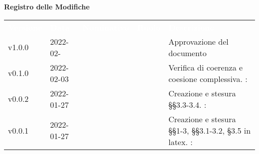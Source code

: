 

{\LARGE{\textbf{Registro delle Modifiche}}} \\
\begin{table}[!htbp]
\renewcommand{\arraystretch}{1.5}
\begin{tabular}{ m{}<{\centering}  m{}<{\centering}  m{}<{\centering}  m{}<{\centering}  m{}<{\centering} }
	\rowcolor{darkblue}
	\textcolor{white}{\textbf{Versione}} &\textcolor{white}{\textbf{Data}}& \textcolor{white}{\textbf{Nominativo}} & \textcolor{white}{\textbf{Ruolo}}&\textcolor{white}{\textbf{Descrizione}}\\ 

	v1.0.0 & 2022-02- & \ & \RE & Approvazione del documento \\

	v0.1.0& 2022-02-03 & \FP & \VE & Verifica di coerenza e coesione complessiva. \VE: \textit{\PV}\\

	v0.0.2& 2022-01-27& \FP &\AN & Creazione e stesura \S\S{}3.3-3.4. \VE: \textit{\PV}\\

	v0.0.1& 2022-01-27& \GC &\AN & Creazione e stesura \S\S{}1-3, \S\S{}3.1-3.2, \S3.5 in latex. \VE: \textit{\PV}\\

\end{tabular}
\end{table}

\pagebreak